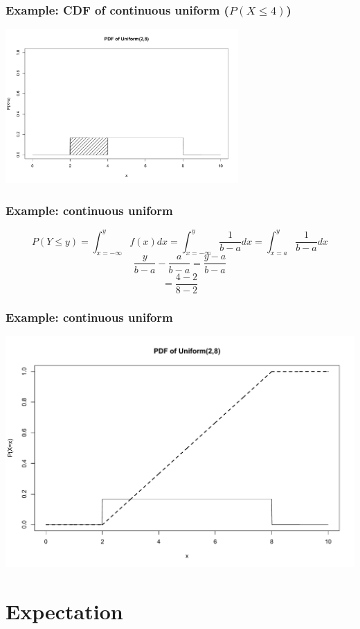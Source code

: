 \documentclass[aspectratio=169, handout]{beamer}
\numberwithin{equation}{section}
\begin{document}
\begin{frame}
\frametitle{Example: CDF of continuous uniform ($P(X\leq4)$)}
\begin{center}
\includegraphics[width=3.5in]{images/Udists3.pdf}
\end{center}

\end{frame}




\begin{frame}
\frametitle{Example: continuous uniform}

$$P(Y\leq y)=\int_{x=-\infty}^{y}f(x)dx=\int_{x=-\infty}^{y}\frac{1}{b-a}dx=\int_{x=a}^{y}\frac{1}{b-a}dx$$\pause
$$\frac{y}{b-a}-\frac{a}{b-a}=\frac{y-a}{b-a}$$\pause
 $$=\frac{4-2}{8-2}$$

\end{frame}



\begin{frame}
\frametitle{Example: continuous uniform}
\begin{center}
\includegraphics[width=3.5 in]{images/Udists4.pdf}
\end{center}

\end{frame}



\section{Expectation}
\end{document}

